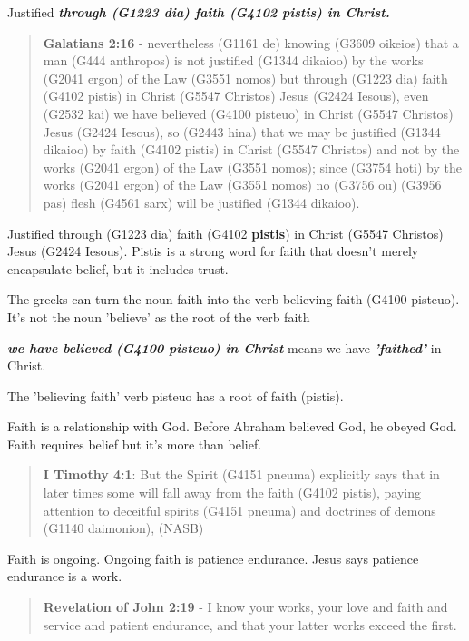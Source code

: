 \documentclass[11pt]{article}
\begin{document}
Justified \emph{\textbf{through (G1223 dia) faith (G4102 pistis) in Christ.}}

\begin{quote}
\textbf{Galatians 2:16} - nevertheless (G1161 de) knowing (G3609 oikeios) that a man (G444 anthropos) is not justified (G1344 dikaioo) by the works (G2041 ergon) of the Law (G3551 nomos) but through (G1223 dia) faith (G4102 pistis) in Christ (G5547 Christos) Jesus (G2424 Iesous), even (G2532 kai) we have believed (G4100 pisteuo) in Christ (G5547 Christos) Jesus (G2424 Iesous), so (G2443 hina) that we may be justified (G1344 dikaioo) by faith (G4102 pistis) in Christ (G5547 Christos) and not by the works (G2041 ergon) of the Law (G3551 nomos); since (G3754 hoti) by the works (G2041 ergon) of the Law (G3551 nomos) no (G3756 ou) (G3956 pas) flesh (G4561 sarx) will be justified (G1344 dikaioo).
\end{quote}

Justified through (G1223 dia) faith (G4102 \textbf{pistis}) in Christ (G5547 Christos) Jesus (G2424 Iesous).
Pistis is a strong word for faith that doesn't merely encapsulate belief, but it includes trust.

The greeks can turn the noun faith into the verb believing faith (G4100 pisteuo).
It's not the noun 'believe' as the root of the verb faith

\emph{\textbf{we have believed (G4100 pisteuo) in Christ}} means we have \emph{\textbf{'faithed'}} in Christ.

The 'believing faith' verb pisteuo has a root of faith (pistis).

Faith is a relationship with God.
Before Abraham believed God, he obeyed God.
Faith requires belief but it's more than belief.

\begin{quote}
\textbf{I Timothy 4:1}: But the Spirit (G4151 pneuma) explicitly says that in later times some will fall away from the faith (G4102 pistis), paying attention to deceitful spirits (G4151 pneuma) and doctrines of demons (G1140 daimonion), (NASB)
\end{quote}

Faith is ongoing. Ongoing faith is patience endurance. Jesus says patience endurance is a work.

\begin{quote}
\textbf{Revelation of John 2:19} - I know your works, your love and faith and service and patient endurance, and that your latter works exceed the first.
\end{quote}
\end{document}
